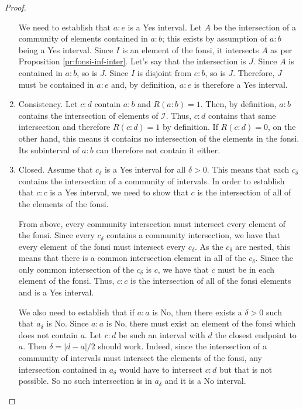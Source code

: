 \documentclass[12pt]{article}
\begin{document}
\begin{proof}
\begin{enumerate}
    We need to establish that $a:e$ is a Yes interval. Let $A$ be the intersection of a community of elements contained in $a:b$; this exists by assumption of $a:b$ being a Yes interval. Since $I$ is an element of the fonsi, it intersects $A$ as per Proposition \ref{pr:fonsi-inf-inter}. Let's say that the intersection is $J$. Since $A$ is contained in $a:b$, so is $J$. Since $I$ is disjoint from $e:b$, so is $J$. Therefore, $J$ must be contained in $a:e$ and, by definition, $a:e$ is therefore a Yes interval. 
    
    \item Consistency. Let $c:d$ contain $a:b$ and $R(a:b)=1$. Then, by definition, $a:b$ contains the intersection of elements of $\mathcal{I}$. Thus, $c:d$ contains that same intersection and therefore $R(c:d)=1$ by definition. If $R(c:d) = 0$, on the other hand, this means it contains no intersection of the elements in the fonsi. Its subinterval of $a:b$ can therefore not contain it either. 
    
    \item Closed. Assume that $c_\delta$ is a Yes interval for all $\delta > 0$. This means that each $c_\delta$ contains the intersection of a community of intervals. In order to establish that $c:c$ is a Yes interval, we need to show that $c$ is the intersection of all of the elements of the fonsi. 

    From above, every community intersection must intersect every element of the fonsi. Since every $c_\delta$ contains a community intersection, we have that every element of the fonsi must intersect every $c_\delta$. As the $c_\delta$ are nested, this means that there is a common intersection element in all of the $c_\delta$. Since the only common intersection of the $c_\delta$ is $c$, we have that $c$ must be in each element of the fonsi.  Thus, $c:c$ is the intersection of all of the fonsi elements and is a Yes interval. 

    We also need to establish that if $a:a$ is No, then there exists a $\delta >0$ such that $a_\delta$ is No. Since $a:a$ is No, there must exist an element of the fonsi which does not contain $a$. Let $c:d$ be such an interval with $d$ the closest endpoint to $a$. Then $\delta = |d-a|/2$ should work. Indeed, since the intersection of a community of intervals must intersect the elements of the fonsi, any intersection contained in $a_\delta$ would have to intersect $c:d$ but that is not possible. So no such intersection is in $a_\delta$ and it is a No interval. 
    

\end{enumerate}
\end{proof}
\end{document}
